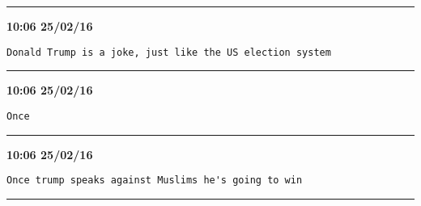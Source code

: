 \hrule%

\begin{adjustwidth}{0cm}{0cm}
\footnotesize \textbf{10:06 25/02/16}

\begin{lstlisting}[breaklines, breakatwhitespace, basicstyle=\small, frame=leftline]
Donald Trump is a joke, just like the US election system
\end{lstlisting}
\end{adjustwidth}

\hrule%

\begin{adjustwidth}{0cm}{0cm}
\footnotesize \textbf{10:06 25/02/16}

\begin{lstlisting}[breaklines, breakatwhitespace, basicstyle=\small, frame=leftline]
Once
\end{lstlisting}
\end{adjustwidth}

\hrule%

\begin{adjustwidth}{0cm}{0cm}
\footnotesize \textbf{10:06 25/02/16}

\begin{lstlisting}[breaklines, breakatwhitespace, basicstyle=\small, frame=leftline]
Once trump speaks against Muslims he's going to win
\end{lstlisting}
\end{adjustwidth}

\hrule%

